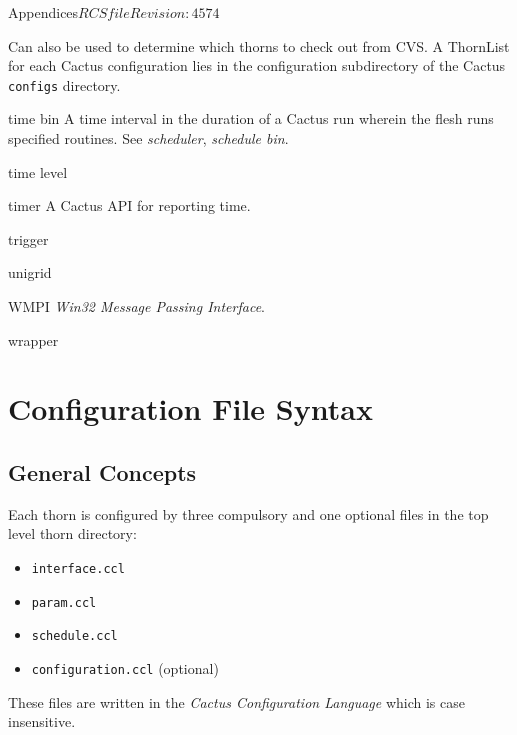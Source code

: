 \begin{cactuspart}{Appendices}{$RCSfile$}{$Revision: 4574 $}
\begin{Lentry}
  Can also be used to determine which thorns
  to check out from CVS.%
  A ThornList for each Cactus configuration lies in the configuration
  subdirectory of the Cactus {\tt configs} directory.
\item[time bin]
  A time interval in the duration of a Cactus run wherein the flesh 
  runs specified routines.  See \textit{scheduler}, \textit{schedule bin}.
\item[time level]
\item[timer]
  A Cactus API for reporting time.%
\item[trigger]
\item[unigrid]
\item[WMPI]
  \textit{Win32 Message Passing Interface}.
\item[wrapper]

\end{Lentry}


\chapter{Configuration File Syntax}
\label{sec:Appendix.ccl}

\section{General Concepts}

Each thorn is configured by three compulsory and one optional files in the
top level thorn directory:
\begin{itemize}
\item{} {\tt interface.ccl}
\item{} {\tt param.ccl}
\item{} {\tt schedule.ccl}
\item{} {\tt configuration.ccl} (optional)
\end{itemize}
These files are written in the \textit{Cactus Configuration Language} which is
case insensitive.



\end{cactuspart}
